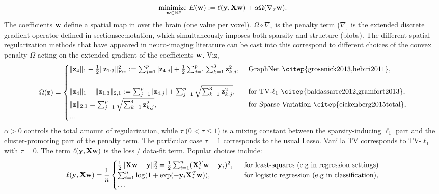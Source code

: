 \begin{equation}
  \underset{\mathbf{w} \in \mathbb R^p}{\text{minimize }}E(\mathbf{w}) := \ell(\mathbf{y},\mathbf{X}\mathbf{w}) + \alpha \Omega(\nabla_\tau\mathbf{w}).
    \label{eq:opt_pb}
\end{equation}
The coefficients ${\mathbf{w}}$ define a spatial map in over the brain (one value per voxel).
$\Omega \circ \nabla_\tau$ is the penalty term ($\nabla_\tau$ is the extended discrete gradient operator defined in section{sec:notation}, which simultaneously imposes both sparsity and structure (blobs). The different spatial regularization
methods that have appeared in neuro-imaging literature can be cast into this
correspond to different choices of the convex penalty $\Omega$ acting on the extended gradient of the coefficients $\mathbf{w}$. Viz,
\[
  \begin{split}
  \Omega(\z) = \begin{cases}
      \|\z_4\|_1 + \frac{1}{2}\|\z_{1:3}\|_{\text{Fro}}^2 := \sum_{j=1}^p|\z_{4,j}| + \frac{1}{2}\sum_{j=1}^{p}\sum_{k=1}^3\z_{k,j}^2, &\mbox{ GraphNet \citep{grosenick2013,hebiri2011}},\\\\
      \|\z_4\|_1 + \|\z_{1:3}\|_{2,1} := \sum_{j=1}^p|\z_{4,j}| + \sum_{j=1}^{p}\sqrt{\sum_{k=1}^3\z_{k,j}^2}, &\mbox{ for TV-$\ell_1$ \citep{baldassarre2012,gramfort2013}},\\
      \|\z\|_{2,1} = \sum_{j=1}^{p}\sqrt{\sum_{k=1}^4\z_{k,j}^2}, &\mbox{ for Sparse Variation \citep{eickenberg2015total}},\\
      ...
    \end{cases}
  \end{split}
\]
{$\alpha > 0$} controls the total amount of regularization, while
  {$\tau$
    ($0 < \tau \le 1$)} is a
  mixing constant between
  the {sparsity-inducing} $\ell_1$ part and the
  {cluster-promoting} part of the penalty term.
  The particular case {$\tau = 1$} corresponds to the usual Lasso. Vanilla TV  \citep{michel2011tv} corresponds to TV-$\ell_1$ with $\tau = 0$.
The term {$\ell(\mathbf{y},\mathbf{X}\mathbf{w})$} is the
  {loss / data-fit term}. Popular choices include:
  $$
  \ell(\mathbf{y},\mathbf{X}\mathbf{w}) = \frac{1}{n}\begin{cases}\frac{1}{2}\|\mathbf{X}\mathbf{w} - \mathbf{y}\|_2^2 = \frac{1}{2}\sum_{i=1}^n(\mathbf{X}^T_i\mathbf{w} - \mathbf{y}_i)^2,
    &\mbox{ \text{ for least-squares (e.g in regression settings)}}\\
    \sum_{i=1}^n \log(1+\exp(-\mathbf{y}_i\mathbf{X}_i^T\mathbf{w})),
    &\mbox{ \text{ for logistic regression (e.g in classification)}},\\\ldots\end{cases}$$
  
